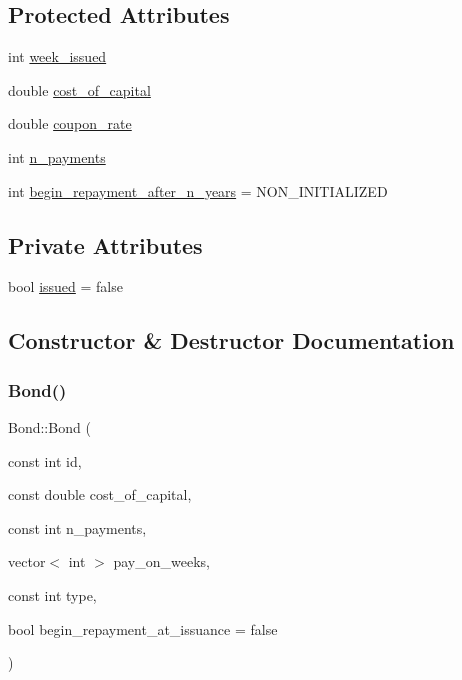 \subsection*{Protected Attributes}
\begin{DoxyCompactItemize}
\item 
int \mbox{\hyperlink{classBond_a30d48d158cbbd9c7b4bfa0012c89590a_a30d48d158cbbd9c7b4bfa0012c89590a}{week\+\_\+issued}}
\item 
double \mbox{\hyperlink{classBond_ad98df7d28b398e620286f95ee085439b_ad98df7d28b398e620286f95ee085439b}{cost\+\_\+of\+\_\+capital}}
\item 
double \mbox{\hyperlink{classBond_a5f66785534e24caa43d9f730130a6463_a5f66785534e24caa43d9f730130a6463}{coupon\+\_\+rate}}
\item 
int \mbox{\hyperlink{classBond_a4a227b6de2eeada118d82ab1633b1db8_a4a227b6de2eeada118d82ab1633b1db8}{n\+\_\+payments}}
\item 
int \mbox{\hyperlink{classBond_a8d808753f9708e841dfceca72a110737_a8d808753f9708e841dfceca72a110737}{begin\+\_\+repayment\+\_\+after\+\_\+n\+\_\+years}} = N\+O\+N\+\_\+\+I\+N\+I\+T\+I\+A\+L\+I\+Z\+ED
\end{DoxyCompactItemize}
\subsection*{Private Attributes}
\begin{DoxyCompactItemize}
\item 
bool \mbox{\hyperlink{classBond_adafb5c5d73f072f7139891478a658a10_adafb5c5d73f072f7139891478a658a10}{issued}} = false
\end{DoxyCompactItemize}


\subsection{Constructor \& Destructor Documentation}
\mbox{\label{classBond_ac2ed54d795433c9c6a4236629553fb83_ac2ed54d795433c9c6a4236629553fb83}} 
\subsubsection{\texorpdfstring{Bond()}{Bond()}\hspace{0.1cm}{\footnotesize\ttfamily [1/4]}}
{\footnotesize\ttfamily Bond\+::\+Bond (\begin{DoxyParamCaption}\item[{const int}]{id,  }\item[{const double}]{cost\+\_\+of\+\_\+capital,  }\item[{const int}]{n\+\_\+payments,  }\item[{vector$<$ int $>$}]{pay\+\_\+on\+\_\+weeks,  }\item[{const int}]{type,  }\item[{bool}]{begin\+\_\+repayment\+\_\+at\+\_\+issuance = {\ttfamily false} }\end{DoxyParamCaption})}

